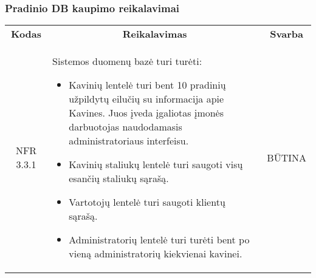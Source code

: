 \documentclass{VUMIFPSkursinis}
\begin{document}
\subsubsection{Pradinio DB kaupimo reikalavimai}
\begin{center}
	\begin{table}[H]
	\begin{tabular}{|p{2cm}|p{}|p{}|}
	\hline
	    \rowcolor{lightgray}
		\multicolumn{3}{|c|}{Pradinio DB kaupimo reikalavimai}\\
		
	\hline
		\multicolumn{1}{|c|}{{\bfseries Kodas}}&
		\multicolumn{1}{|c|}{{\bfseries Reikalavimas}}&
		\multicolumn{1}{|c|}{{\bfseries Svarba}}\\
	\hline 	
		\multicolumn{1}{|c|}{NFR 3.3.1}&
		{Sistemos duomenų bazė turi turėti:
			\begin{itemize}
				\item Kavinių lentelė turi bent 10 pradinių užpildytų eilučių su informacija apie Kavines. Juos įveda įgaliotas įmonės darbuotojas naudodamasis administratoriaus interfeisu.
				\item Kavinių staliukų lentelė turi saugoti visų esančių staliukų sąrašą.
				\item Vartotojų lentelė turi saugoti klientų sąrašą.
				\item Administratorių lentelė turi turėti bent po vieną administratorių kiekvienai kavinei.
			\end{itemize}}&
		\multicolumn{1}{|c|}{BŪTINA}\\	
	
	\hline 	
	
	\end{tabular}
	\end{table}

\end{center}
\end{document}
